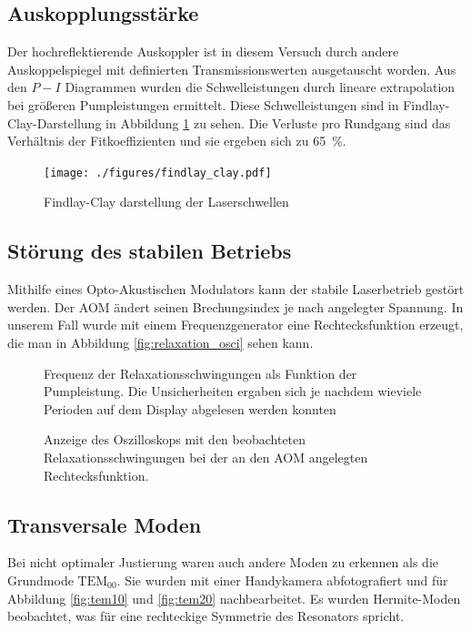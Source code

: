\documentclass[11pt,twoside=semi]{scrartcl}
\begin{document}
\subsection{Auskopplungsstärke}
Der hochreflektierende Auskoppler ist in diesem Versuch durch andere Auskoppelspiegel
mit definierten Transmissionswerten ausgetauscht worden. Aus den $P-I$  Diagrammen
wurden die Schwelleistungen durch lineare extrapolation bei größeren Pumpleistungen
ermittelt. Diese Schwelleistungen sind in Findlay-Clay-Darstellung in Abbildung
\ref{fig:findlay_clay} zu sehen. Die Verluste pro Rundgang sind das Verhältnis
der Fitkoeffizienten und sie ergeben sich zu \SI{65}{\percent}. 
\begin{figure}[H]
  \centering
  \texttt{[image: ./figures/findlay\_clay.pdf]}
  \caption{Findlay-Clay darstellung der Laserschwellen}
  \label{fig:findlay_clay}
\end{figure}

\subsection{Störung des stabilen Betriebs}
Mithilfe eines Opto-Akustischen Modulators kann der stabile Laserbetrieb gestört
werden. Der AOM ändert seinen Brechungsindex je nach angelegter Spannung. In unserem 
Fall wurde mit einem Frequenzgenerator eine Rechtecksfunktion erzeugt, die man
in Abbildung \ref{fig:relaxation_osci} sehen kann.
\begin{figure}[H]
  \begin{floatrow}
     {
      \caption{Frequenz der Relaxationsschwingungen als Funktion der Pumpleistung. Die Unsicherheiten
      ergaben sich je nachdem wieviele Perioden auf dem Display abgelesen werden konnten}
    }
     {
      \caption{Anzeige des Oszilloskops mit den beobachteten Relaxationsschwingungen bei
      der an den AOM angelegten Rechtecksfunktion.}
    }
  \end{floatrow}
\end{figure}


\subsection{Transversale Moden}
Bei nicht optimaler Justierung waren auch andere Moden zu erkennen als die 
Grundmode $\text{TEM}_{00}$. Sie wurden mit einer Handykamera abfotografiert und
für Abbildung \ref{fig:tem10} und \ref{fig:tem20} nachbearbeitet. Es wurden 
Hermite-Moden beobachtet, was für eine rechteckige Symmetrie des Resonators spricht. 
\end{document}
